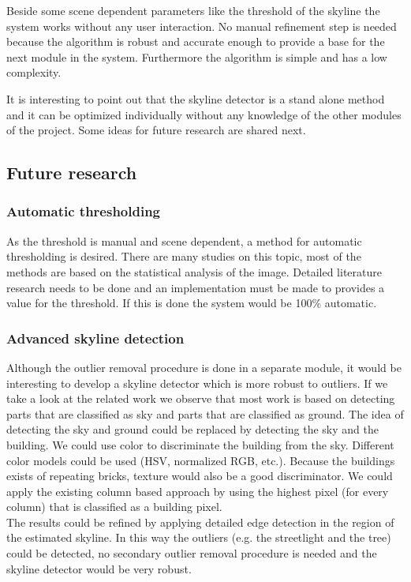 Beside some scene dependent parameters like the threshold of the skyline the
system works without any user interaction. No manual refinement step is needed
because the algorithm is robust and accurate enough to provide a base for the
next module in the system. Furthermore the algorithm is simple and has a low
complexity. 

It is interesting to point out that the skyline detector is a stand alone method
and it can be optimized individually without any knowledge of the other modules
of the project.  Some ideas for future research are shared next.

\subsection{Future research}
\subsubsection{Automatic thresholding}
As the threshold is manual and scene dependent, a method for automatic
thresholding is desired. There are many studies on this topic, most of the
methods are based on the statistical analysis of the image. Detailed literature
research needs to be done and an implementation must be made to provides a value
for the threshold. If this is done the system would be 100\% automatic.

\subsubsection{Advanced skyline detection}
Although the outlier removal procedure is done in a separate module, it would be
interesting to develop a skyline detector which is more robust to
outliers. 
If we take a look at the related work we observe that most work is based on
detecting parts that are classified as sky and parts that are classified as
ground. The idea of detecting the sky and ground could be replaced by detecting
the sky and the building. We could use color to discriminate the building from
the sky. Different color models could be used (HSV, normalized RGB, etc.).
Because the buildings exists of repeating bricks, texture would also be a good
discriminator. We could apply the existing column based approach by using the
highest pixel (for every column) that is classified as a building pixel.\\

The results could be refined by applying detailed edge detection in the region of
the estimated skyline. In this way the outliers (e.g. the streetlight and the
tree) could be detected, no secondary outlier removal procedure is needed and
the skyline detector would be very robust.




